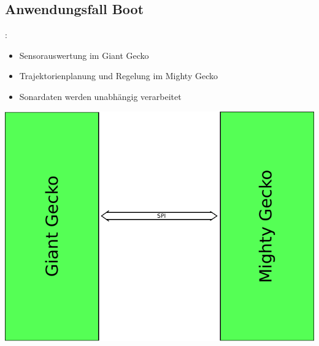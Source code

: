 \documentclass{beamer}
\begin{document}
\subsection{Anwendungsfall Boot}
\begin{frame}{\insertsection: \insertsubsection}
\begin{minipage}{0.45\linewidth}
	\begin{itemize}
		\item Sensorauswertung im Giant Gecko
		\item Trajektorienplanung und Regelung im Mighty Gecko
		\item Sonardaten werden unabhängig verarbeitet
	\end{itemize}
\end{minipage} \quad
\begin{minipage}{0.45\linewidth}
	\includegraphics[width=\linewidth]{microcontrollers}
\end{minipage}
\end{frame}
\end{document}
